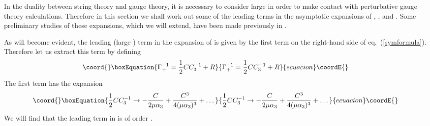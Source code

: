 \documentclass[a4paper,12pt]{article}
\begin{document}
In the duality between string theory and gauge theory, it is
necessary to consider large \myHighlight{$\mu$}\coordHE{} in order to make contact with
perturbative gauge theory calculations. Therefore in this section
we shall work out some of the leading terms in the asymptotic
expansions of \coordHE{}, \coordHE{}, and \coordHE{}. Some preliminary studies of these
expansions, which we will extend, have been made previously in
\cite{Huang:2002wf} \cite{Spradlin:2002rv} \cite{Klebanov:2002mp}.

As will become evident, the leading (large \myHighlight{$\mu$}\coordHE{}) term in the
expansion of \coordHE{} is given by the first term on the
right-hand side of eq.~(\ref{symformula}). Therefore let us
extract this term by defining
\begin{equation}\coord{}\boxEquation{ \label{decomp}
\Gamma_+^{-1} = {1 \over 2} C C_3^{-1} + R
}{ \Gamma_+^{-1} = {1 \over 2} C C_3^{-1} + R
}{ecuacion}\coordE{}\end{equation}
The first term has the expansion
\begin{equation}\coord{}\boxEquation{
{1 \over 2} C C_3^{-1} \to - {C \over 2 \mu \alpha_3} + {C^3 \over
4 (\mu \alpha_3)^3} + \dots
}{
{1 \over 2} C C_3^{-1} \to - {C \over 2 \mu \alpha_3} + {C^3 \over
4 (\mu \alpha_3)^3} + \dots
}{ecuacion}\coordE{}\end{equation}
We will find that the leading term in \coordHE{} is of order \coordHE{}.
\end{document}

